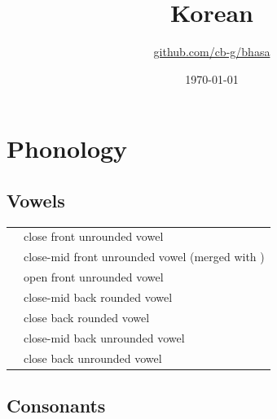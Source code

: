 \documentclass{article}
\title{Korean\\\ipa{[han.gu.g2]}}
\author{\href{https://github.com/cb-g/bhasa}{github.com/cb-g/bhasa}}
\date{\today}
\begin{document}
\pagecolor{custom_bg}\color{custom_fg}
\maketitle\thispagestyle{empty}

\newpage\setcounter{page}{1}\section{Phonology}

\subsection{Vowels}

\begin{xltabular}{\textwidth}{lL}
   & close front unrounded vowel \\
   & close-mid front unrounded vowel (merged with ) \\
   & open front unrounded vowel \\
   & close-mid back rounded vowel \\
   & close back rounded vowel \\
   & close-mid back unrounded vowel \\
   & close back unrounded vowel \\
\end{xltabular}

\subsection{Consonants}
\end{document}
